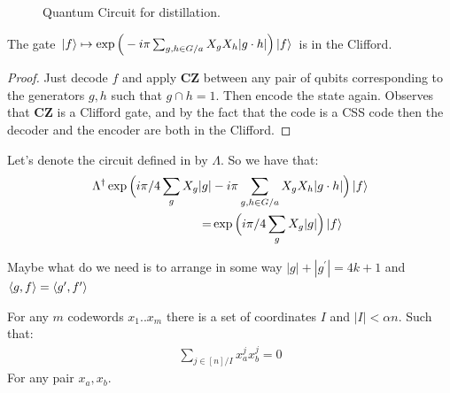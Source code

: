 \documentclass[manuscript,screen,review]{acmart}
\begin{document}
\begin{figure}
  \centering
  \caption{Quantum Circuit for distillation.}
  \label{fig:circuit}
\end{figure}

\begin{claim}
  \label{claim:phase}
  The gate $\ket{f} \mapsto \exp \Big(  -  i\pi \sum_{g,h \in G/a} X_{g}X_{h}|g\cdot h|  \Big) \ket{f} $ is in the Clifford.  
\end{claim}
\begin{proof}
Just decode $f$ and apply \textbf{CZ} between any pair of qubits corresponding to the generators $g,h$ such that $g \cap h = 1$. Then encode the state again. Observes that \textbf{CZ} is a Clifford gate, and by the fact that the code is a CSS code then the decoder and the encoder are both in the Clifford.
\end{proof}
Let's denote the circuit defined in  by $\Lambda$. So we have that:  
\begin{equation*}
  \begin{split}
    \Lambda^{\dagger}\exp \Big( i\pi/4 \sum_{g} X_{g}|g|  & -  i\pi \sum_{g,h \in G/a} X_{g}X_{h}|g\cdot h|  \Big) \ket{f} \\
= & \exp \Big( i\pi/4 \sum_{g} X_{g}|g|  \Big) \ket{f} 
  \end{split}
\end{equation*}

Maybe what do we need is to arrange in some way $|g|+|g^{\prime}| = 4k+1$ and $\braket{g,f}= \braket{g^{\prime},f^{\prime}}$


\begin{claim}
  For any $m$ codewords $x_{1}..x_{m}$ there is a set of coordinates $I$ and $|I| < \alpha n$. Such that:  
  \begin{equation*}
    \begin{split}
      \sum_{j \in [n]/I }x_{a}^{j}x_{b}^{j} = 0
    \end{split}
  \end{equation*}
  For any pair $x_{a},x_{b}$. 
\end{claim}
\end{document}
